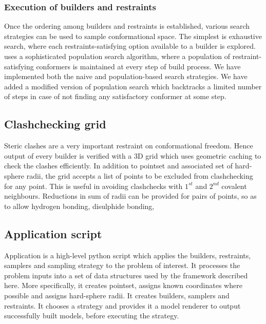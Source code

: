 \documentclass{article}[14pts]
\begin{document}
\subsubsection{Execution of builders and restraints}
Once the ordering among builders and restraints is established, various search strategies can be used to sample conformational space. The simplest is exhaustive search, where each restraints-satisfying option available to a builder is explored. \rapper uses a sophisticated population search algorithm, where a population of restraint-satisfying conformers is maintained at every step of build process. We have implemented both the naive and population-based search strategies. We have added a modified version of population search which backtracks a limited number of steps in case of not finding any satisfactory conformer at some step.

\subsection{Clashchecking grid}
Steric clashes are a very important restraint on conformational freedom. Hence output of every builder is verified with a 3D grid which uses geometric caching to check the clashes efficiently. In addition to pointset and associated set of hard-sphere radii, the grid accepts a list of points to be excluded from clashchecking for any point. This is useful in avoiding clashchecks with $1^{st}$ and $2^{nd}$ covalent neighbours. Reductions in sum of radii can be provided for pairs of points, so as to allow hydrogen bonding, disulphide bonding, \etc

\subsection{Application script}
Application is a high-level python script which applies the builders, restraints, samplers and sampling strategy to the problem of interest. It processes the problem inputs into a set of data structures used by the framework described here. More specifically, it creates pointset, assigns known coordinates where possible and assigns hard-sphere radii. It creates builders, samplers and restraints. It chooses a strategy and provides it a model renderer to output successfully built models, before executing the strategy.
\end{document}
